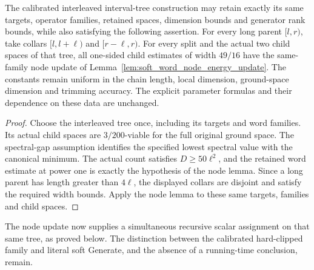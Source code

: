\begin{lemma}
    \label{thm:physical_interleaved_tree_energy_updates}
    \leanok
    The calibrated interleaved interval-tree construction may retain
    exactly its same targets, operator families, retained spaces, dimension
    bounds and generator rank bounds, while also satisfying the following
    assertion. For every long parent $[l,r)$, take collars $[l,l+\ell)$
    and $[r-\ell,r)$. For every split and the actual two child spaces
    of that tree, all one-sided child estimates of width $49/16$ have
    the same-family node update of Lemma~\ref{lem:soft_word_node_energy_update}.
    The constants remain uniform in the chain length, local dimension,
    ground-space dimension and trimming accuracy. The explicit parameter
    formulas and their dependence on these data are unchanged.
\end{lemma}
\begin{proof}\leanok
    Choose the interleaved tree once, including its targets and word
    families. Its actual child spaces are $3/200$-viable for the full
    original ground space. The spectral-gap assumption identifies the
    specified lowest spectral value with the canonical minimum. The
    actual count satisfies $D\ge50\ell^2$, and the retained word estimate
    at power one is exactly the hypothesis of the node lemma. Since a
    long parent has length greater than $4\ell$, the displayed collars
    are disjoint and satisfy the required width bounds. Apply the node
    lemma to these same targets, families and child spaces.
\end{proof}

The node update now supplies a simultaneous recursive scalar assignment
on that same tree, as proved below. The distinction between the calibrated
hard-clipped family and literal soft Generate, and the absence of a
running-time conclusion, remain.


